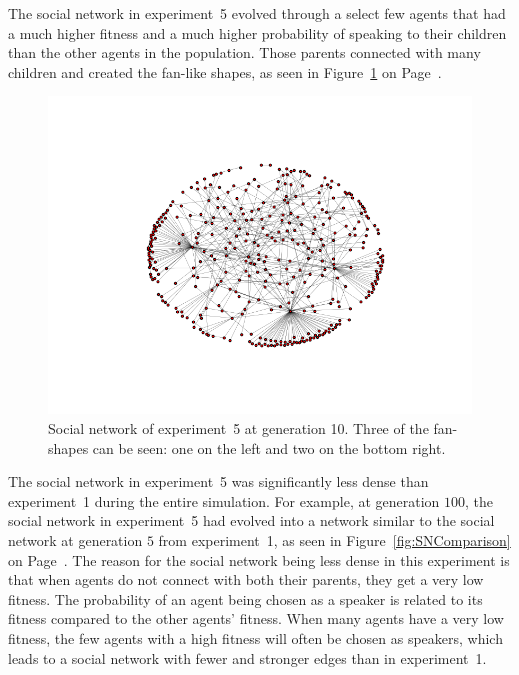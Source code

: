 The social network in experiment~5 evolved through a select few agents that had a much higher fitness and a much higher probability of speaking to their children than the other agents in the population. Those parents connected with many children and created the fan-like shapes, as seen in Figure~\ref{exp5SN10} on Page~\pageref{exp5SN10}.

\begin{figure}
    \centering
    \includegraphics[width=0.49\linewidth]{fig/Results/Exp5/_graph10}
    \caption[The social network at generation number 10 in experiment 5.]{Social network of experiment~5 at generation 10. Three of the fan-shapes can be seen: one on the left and two on the bottom right.}
    \label{exp5SN10}
\end{figure}

The social network in experiment~5 was significantly less dense than experiment~1 during the entire simulation. For example, at generation $100$, the social network in experiment~5 had evolved into a network similar to the social network at generation $5$ from experiment~1, as seen in Figure~\ref{fig:SNComparison} on Page~\pageref{fig:SNComparison}. The reason for the social network being less dense in this experiment is that when agents do not connect with both their parents, they get a very low fitness. The probability of an agent being chosen as a speaker is related to its fitness compared to the other agents' fitness. When many agents have a very low fitness, the few agents with a high fitness will often be chosen as speakers, which leads to a social network with fewer and stronger edges than in experiment~1.

